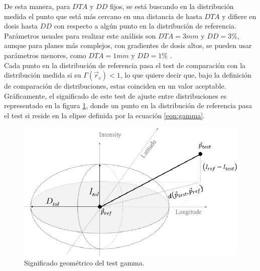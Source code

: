 De esta manera, para $DTA$ y $DD$ fijos, se está buscando en la distribución medida el punto que está más cercano en una distancia de hasta $DTA$ y difiere en dosis hasta $DD$ con respecto a algún punto en la distribución de referencia. Parámetros usuales para realizar este análisis son $DTA=3 mm$ y $DD=3\%$, aunque para planes más complejos, con gradientes de dosis altos, se pueden usar parámetros menores, como $DTA=1 mm$ y $DD=1\%$ \cite{Li2011}.\\

Cada punto en la distribución de referencia pasa el test de comparación con la distribución medida si su $\Gamma(\vec{r}_c)<1$, lo que quiere decir que, bajo la definición de comparación de distribuciones, estas coinciden en un valor aceptable. Gráficamente, el significado de este test de ajuste entre distribuciones es representado en la figura \ref{fig:elipseGamma}, donde un punto en la distribución de referencia pasa el test si reside en la elipse  definida por la ecuación \eqref{eqn:gamma}.\\
\begin{figure}[H]
	\centering
	\includegraphics[width=0.5\linewidth]{images/gammaEllipse.png}
	\caption{Significado geométrico del test gamma\cite{Cappuci}. }
	\label{fig:elipseGamma}
\end{figure}





